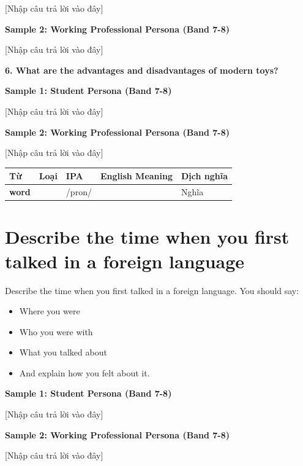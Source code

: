 [Nhập câu trả lời vào đây]

\textbf{Sample 2: Working Professional Persona (Band 7-8)}

[Nhập câu trả lời vào đây]

\separator

\begin{ieltsquestion}
\textbf{6. What are the advantages and disadvantages of modern toys?}
\end{ieltsquestion}
\textbf{Sample 1: Student Persona (Band 7-8)}

[Nhập câu trả lời vào đây]

\textbf{Sample 2: Working Professional Persona (Band 7-8)}

[Nhập câu trả lời vào đây]

\separator


\vspace{0.8em}
\begin{center}
\renewcommand{\arraystretch}{1.65}
\begin{tabularx}{\textwidth}{|V{0.22\textwidth}|C{0.07\textwidth}|I{0.20\textwidth}|Y|V{0.18\textwidth}|}
\hline
{}
\textbf{Từ} & \textbf{Loại} & \textbf{IPA} & \textbf{English Meaning} & \textbf{Dịch nghĩa} \\
\hline
\textbf{word} & & /pron/ & & Nghĩa \\ \hline
\end{tabularx}
\end{center}

\newpage

\section{Describe the time when you first talked in a foreign language}
\begin{ieltsprompt}
Describe the time when you first talked in a foreign language.
You should say:
\begin{itemize}[leftmargin=2em, itemsep=2pt]
\item Where you were
\item Who you were with
\item What you talked about
\item And explain how you felt about it.
\end{itemize}
\end{ieltsprompt}
\begin{ieltsanswer}
\textbf{Sample 1: Student Persona (Band 7-8)}

[Nhập câu trả lời vào đây]

\textbf{Sample 2: Working Professional Persona (Band 7-8)}

[Nhập câu trả lời vào đây]
\end{ieltsanswer}


